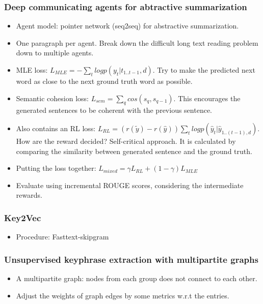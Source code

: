 \subsubsection{Deep communicating agents for abtractive summarization\cite{Celikyilmaz2018Deep}}
\begin{itemize}
	\item Agent model: pointer network (seq2seq) for abstractive summarization.
	\item One paragraph per agent. Break down the difficult long text reading problem down to multiple agents.
	\item MLE loss: $L_{MLE} = -\sum_{t} log p(y_t | t_{1..t-1}, d)$. Try to make the predicted next word as close to the next ground truth word as possible.
	\item Semantic cohesion loss: $L_{sem} = \sum_{q} cos(s_q, s_{q-1})$. This encourages the generated sentences to be coherent with the previous sentence.
	\item Also contains an RL loss:  $L_{RL} = (r(\tilde{y}) - r(\hat{y})) \sum_t logp(\hat{y}_t | \hat{y}_{1..{(t-1)} , d})$. How are the reward decided? Self-critical approach. It is calculated by comparing the similarity between generated sentence and the ground truth.
	\item Putting the loss together: $L_{mixed} = \gamma L_{RL} + (1-\gamma) L_{MLE}$
	\item Evaluate using incremental ROUGE scores, considering the intermediate rewards.
\end{itemize}

\subsubsection{Key2Vec \cite{Mahata2018Key2Vec:}} 
\begin{itemize}
	\item Procedure: Fasttext-skipgram
\end{itemize}

\subsubsection{Unsupervised keyphrase extraction with multipartite graphs \cite{Boudin2018Unsupervised}}
\begin{itemize}
	\item A multipartite graph: nodes from each group does not connect to each other.
	\item Adjust the weights of graph edges by some metrics w.r.t the entries.
\end{itemize}

